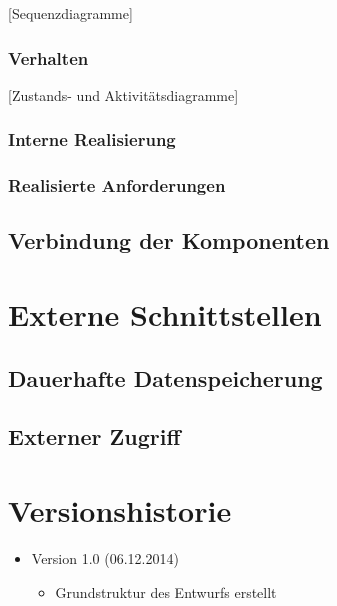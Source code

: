 \documentclass[11pt]{article}
\begin{document}
[Sequenzdiagramme]

\subsubsection{Verhalten}

[Zustands- und Aktivitätsdiagramme]

\subsubsection{Interne Realisierung}

\subsubsection{Realisierte Anforderungen}

\subsection{Verbindung der Komponenten}

\section{Externe Schnittstellen}

\subsection{Dauerhafte Datenspeicherung}

\subsection{Externer Zugriff}

\section{Versionshistorie}

\begin{itemize}
	\item Version 1.0 (06.12.2014)
	\begin{itemize}
		\item Grundstruktur des Entwurfs erstellt
	\end{itemize}
\end{itemize}
\end{document}
